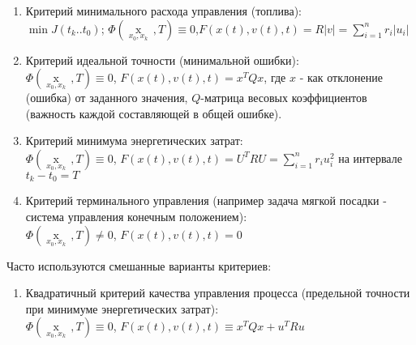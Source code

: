 \documentclass[preprint,russian,a5paper,10pt,twoside]{ncc}
\begin{document}
\begin{itemize}
\begin{enumerate}
\begin{itemize}
\end{itemize}
\item Критерий минимального расхода управления (топлива): 
\\\begin{math}\min J\left( {{t}_{k}}..{{t}_{0}} \right)\end{math}; $\Phi \left( \underset{{{x}_{0}},{{x}_{k}}}{\mathop{x\left( T \right)}}\,,T \right)\equiv 0$,$F\left( x\left( t \right),v\left( t \right),t \right)=R\left| v \right|=\sum\limits_{i=1}^{n}{{{r}_{i}}}\left| {{u}_{i}} \right|$
\item Критерий идеальной точности (минимальной ошибки):\\\begin{math}\Phi \left( \underset{{{x}_{0}},{{x}_{k}}}{\mathop{x\left( T \right)}}\,,T \right)\equiv 0\end{math}, \begin{math}F\left( x\left( t \right),v\left( t \right),t \right)={{x}^{T}}Qx\end{math}, где $x$ - как отклонение (ошибка) от заданного значения, $Q$-матрица весовых коэффициентов (важность каждой составляющей в общей ошибке).
\item Критерий минимума энергетических затрат:\\\begin{math}\Phi \left( \underset{{{x}_{0}},{{x}_{k}}}{\mathop{x\left( T \right)}}\,,T \right)\equiv 0\end{math}, \begin{math}F\left( x\left( t \right),v\left( t \right),t \right)={{U}^{T}}RU=\sum\limits_{i=1}^{n}{{{r}_{i}}}u_{i}^{2}\end{math} на интервале ${{t}_{k}}-{{t}_{0}}=T$
\item Критерий терминального управления (например задача мягкой посадки - система управления конечным положением):\\
$\Phi \left( \underset{{{x}_{0}},{{x}_{k}}}{\mathop{x\left( T \right)}}\,,T \right)\ne 0$, $F\left( x\left( t \right),v\left( t \right),t \right)=0$
\end{enumerate}
Часто используются смешанные варианты критериев:
\begin{enumerate}[resume]
\item Квадратичный критерий качества управления процесса (предельной точности при минимуме энергетических затрат):
\\\begin{math}\Phi \left( \underset{{{x}_{0}}, {{x}_{k}}}{\mathop{x\left( T \right)}}\,,T \right)\equiv 0\end{math}, \begin{math}F\left( x\left( t \right),v\left( t \right),t \right)\equiv {{x}^{T}}Qx+{{u}^{T}}Ru\end{math}

\end{enumerate}
\end{itemize}
\end{document}
